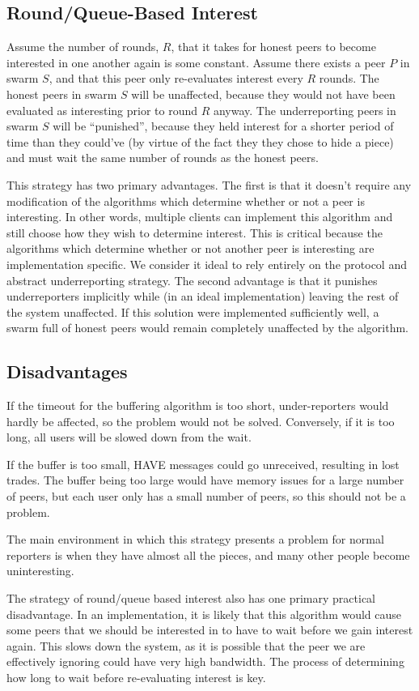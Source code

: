 \subsection {Round/Queue-Based Interest}


Assume the number of rounds, $R$, that it takes for honest peers to become interested in one another again is some constant. Assume there exists a peer $P$ in swarm $S$, and that this peer only re-evaluates interest every $R$ rounds. The honest peers in swarm $S$ will be unaffected, because they would not have been evaluated as interesting prior to round $R$ anyway. The underreporting peers in swarm $S$ will be ``punished'', because they held interest for a shorter period of time than they could've (by virtue of the fact they they chose to hide a piece) and must wait the same number of rounds as the honest peers.

This strategy has two primary advantages. The first is that it doesn't require any modification of the algorithms which determine whether or not a peer is interesting. In other words, multiple clients can implement this algorithm and still choose how they wish to determine interest. This is critical because the algorithms which determine whether or not another peer is interesting are implementation specific. We consider it ideal to rely entirely on the protocol and abstract underreporting strategy. The second advantage is that it punishes underreporters implicitly while (in an ideal implementation) leaving the rest of the system unaffected. If this solution were implemented sufficiently well, a swarm full of honest peers would remain completely unaffected by the algorithm.

\subsection {Disadvantages}

If the timeout for the buffering algorithm is too short, under-reporters would hardly be affected, so the problem would not be solved. Conversely, if it is too long, all users will be slowed down from the wait.

If the buffer is too small, HAVE messages could go unreceived, resulting in lost trades. The buffer being too large would have memory issues for a large number of peers, but each user only has a small number of peers, so this should not be a problem.

The main environment in which this strategy presents a problem for normal reporters is when they have almost all the pieces, and many other people become uninteresting.

The strategy of round/queue based interest also has one primary practical disadvantage. In an implementation, it is likely that this algorithm would cause some peers that we should be interested in to have to wait before we gain interest again. This slows down the system, as it is possible that the peer we are effectively ignoring could have very high bandwidth. The process of determining how long to wait before re-evaluating interest is key.